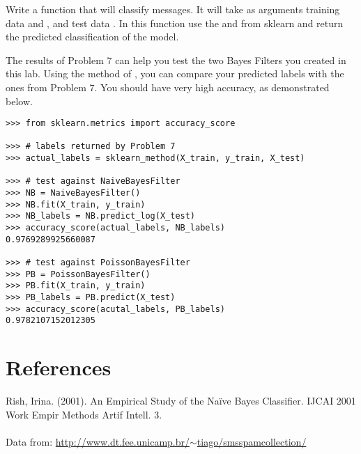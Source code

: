 \begin{problem}
Write a function that will classify messages. 
It will take as arguments training data  and , and test data . 
In this function use the  and  from sklearn and return the predicted classification of the model.
\end{problem}

The results of Problem $7$ can help you test the two Bayes Filters you created in this lab.
Using the  method of , you can compare your predicted labels with the ones from Problem $7$.
You should have very high accuracy, as demonstrated below.
\begin{lstlisting}
>>> from sklearn.metrics import accuracy_score

>>> # labels returned by Problem 7
>>> actual_labels = sklearn_method(X_train, y_train, X_test)

>>> # test against NaiveBayesFilter
>>> NB = NaiveBayesFilter()
>>> NB.fit(X_train, y_train)
>>> NB_labels = NB.predict_log(X_test)
>>> accuracy_score(actual_labels, NB_labels)
0.9769289925660087

>>> # test against PoissonBayesFilter
>>> PB = PoissonBayesFilter()
>>> PB.fit(X_train, y_train)
>>> PB_labels = PB.predict(X_test)
>>> accuracy_score(acutal_labels, PB_labels)
0.9782107152012305
\end{lstlisting}

\section*{References}
Rish, Irina. (2001). An Empirical Study of the Naïve Bayes Classifier. IJCAI 2001 Work Empir Methods Artif Intell. 3.
\\~\\
Data from: \href{http://www.dt.fee.unicamp.br/~tiago/smsspamcollection/}{http://www.dt.fee.unicamp.br/$\sim$tiago/smsspamcollection/}